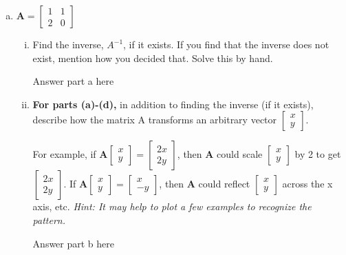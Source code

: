 \documentclass[11pt]{article}
\def\A{\textbf{A}} %
\begin{document}
\begin{enumerate}
\begin{enumerate}[(a)]
	      	\newpage
	      	\item $\A = \begin{bmatrix}
	      	      1 & 1 \\
	      	      2 & 0
	      	\end{bmatrix}$
	      	\begin{enumerate}[i.]
	      		\item Find the inverse, $A^{-1}$, if it exists. If you find that the inverse does not exist, mention how you decided that. Solve this by hand.
	      		      \begin{Answer}
	      		      	Answer part a here
	      		      \end{Answer}
	      		\item \textbf{For parts (a)-(d),} in addition to finding the inverse (if it exists), describe how the matrix A transforms an arbitrary vector $\begin{bmatrix}
	      		      x \\
	      		      y
	      		\end{bmatrix}$.
	      			      		                    
	      		For example, if $\A \begin{bmatrix}
	      		x \\
	      		y
	      		\end{bmatrix} = \begin{bmatrix}
	      		2x \\
	      		2y
	      		\end{bmatrix}$, then $\A$ could scale $\begin{bmatrix}
	      		x \\
	      		y
	      		\end{bmatrix}$ by 2 to get $\begin{bmatrix}
	      		2x \\
	      		2y
	      		\end{bmatrix}$. If $\A \begin{bmatrix}
	      		x \\
	      		y
	      		\end{bmatrix}
	      		=
	      		\begin{bmatrix}
	      			x  \\
	      			-y 
	      		\end{bmatrix}$, then $\A$ could reflect $\begin{bmatrix}
	      		x \\
	      		y
	      		\end{bmatrix}$ across the x axis, etc. \textit{Hint: It may help to plot a few examples to recognize the pattern.}
	      		\begin{Answer}
	      			Answer part b here
	      		\end{Answer}
	      	\end{enumerate}
	      		      		                    

\end{enumerate}
\end{enumerate}
\end{document}
